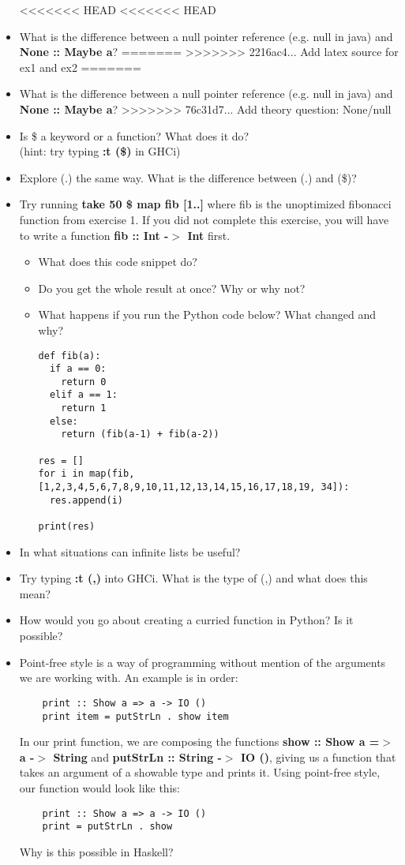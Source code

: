 \documentclass{article}
\begin{document}
\begin{itemize}
<<<<<<< HEAD
<<<<<<< HEAD
    \item What is the difference between a null pointer reference (e.g. null in java) and \textbf{None :: Maybe a}?
=======
>>>>>>> 2216ac4... Add latex source for ex1 and ex2
=======
    \item What is the difference between a null pointer reference (e.g. null in java) and \textbf{None :: Maybe a}?
>>>>>>> 76c31d7... Add theory question: None/null
    \item Is \$ a keyword or a function? What does it do?\\ (hint: try typing \textbf{:t (\$)} in GHCi)
    \item Explore (.) the same way. What is the difference between (.) and (\$)?
    \item Try running \textbf{take 50 \$ map fib [1..]} where fib is the unoptimized fibonacci function from exercise 1. If you did not complete this exercise, you will have to write a function \textbf{fib :: Int -$>$ Int} first.\\
    \begin{itemize}
        \item What does this code snippet do?
        \item Do you get the whole result at once? Why or why not?
        \item What happens if you run the Python code below? What changed and why?
\lstset{language=Python}
\begin{lstlisting}
def fib(a):
  if a == 0:
    return 0
  elif a == 1:
    return 1
  else:
    return (fib(a-1) + fib(a-2))

res = []
for i in map(fib, [1,2,3,4,5,6,7,8,9,10,11,12,13,14,15,16,17,18,19, 34]):
  res.append(i)

print(res)
\end{lstlisting}
    \end{itemize}
    \item In what situations can infinite lists be useful?
    \item Try typing \textbf{:t (,)} into GHCi. What is the type of (,) and what does this mean?
    \item How would you go about creating a curried function in Python? Is it possible?
    \item Point-free style is a way of programming without mention of the arguments we are working with. An example is in order:
    \lstset{language=Haskell}
    \begin{lstlisting}
    print :: Show a => a -> IO ()
    print item = putStrLn . show item
    \end{lstlisting}
    In our print function, we are composing the functions \textbf{show :: Show a =$>$ a -$>$ String} and \textbf{putStrLn :: String -$>$ IO ()}, giving us a function that takes an argument of a showable type and prints it. Using point-free style, our function would look like this:
    \lstset{language=Haskell}
    \begin{lstlisting}
    print :: Show a => a -> IO ()
    print = putStrLn . show
    \end{lstlisting}
    Why is this possible in Haskell?
\end{itemize}
\end{document}
